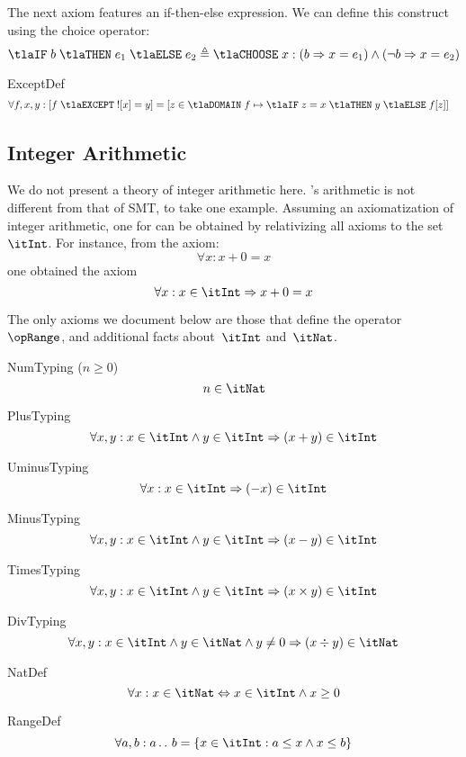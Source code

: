 \documentclass[11pt, a4paper, oneside]{article}
\begin{document}
The next axiom features an if-then-else expression.  We can define this construct using the choice operator: \[
    \tlaIF\; b \;\tlaTHEN\; e_1 \;\tlaELSE\; e_2 \triangleq \tlaCHOOSE\; x : (b \imp x = e_1) \wedge (\neg b \imp x = e_2)
\]

\begin{axioms}
\item[ExceptDef] \[
        \begin{aligned}
            &\forall f, x, y : \bx{ f \;\tlaEXCEPT\; !\!\bx{x} = y } = \bx{ z \in \tlaDOMAIN\; f \mapsto \tlaIF\; z = x \;\tlaTHEN\; y \;\tlaELSE\; f\!\bx{z} }
        \end{aligned}
    \]

\end{axioms}


    \subsection{Integer Arithmetic}
    \label{subsec:ints}

We do not present a theory of integer arithmetic here.  \TLA's arithmetic is not different from that of SMT, to take one example.  Assuming an axiomatization of integer arithmetic, one for \TLA can be obtained by relativizing all axioms to the set~$\itInt$.  For instance, from the axiom: \[
    \forall x : x + 0 = x
\] one obtained the \TLA axiom \[
    \forall x : x \in \itInt \imp x + 0 = x
\]

The only axioms we document below are those that define the operator~$\opRange$, and additional facts about~$\itInt$ and~$\itNat$.

\begin{axioms}
\item[NumTyping ($n \ge 0$)] \[
        n \in \itNat
    \]

\item[PlusTyping] \[
        \forall x, y : x \in \itInt \wedge y \in \itInt \imp (x + y) \in \itInt
    \]

\item[UminusTyping] \[
        \forall x : x \in \itInt \imp (- x) \in \itInt
    \]

\item[MinusTyping] \[
        \forall x, y : x \in \itInt \wedge y \in \itInt \imp (x - y) \in \itInt
    \]

\item[TimesTyping] \[
        \forall x, y : x \in \itInt \wedge y \in \itInt \imp (x \times y) \in \itInt
    \]

\item[DivTyping] \[
        \forall x, y : x \in \itInt \wedge y \in \itNat \wedge y \neq 0 \imp (x \div y) \in \itNat
    \]

\item[NatDef] \[
        \forall x : x \in \itNat \eqv x \in \itInt \wedge x \ge 0
    \]

\item[RangeDef] \[
        \forall a, b : a \ltwodots b = \st{ x \in \itInt : a \le x \wedge x \le b }
    \]

\end{axioms}
\end{document}
